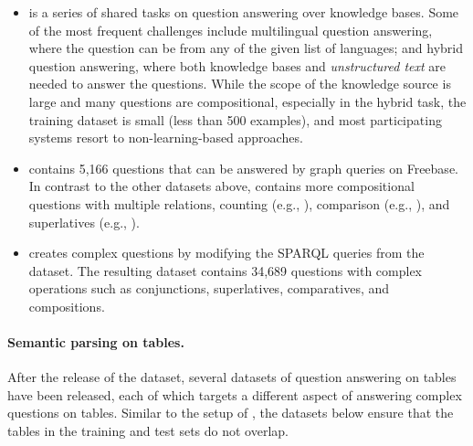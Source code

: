 \begin{itemize}

\item {} \cite{lopez2013evaluating}
is a series of shared tasks on question answering
over knowledge bases. Some of the most frequent challenges include
multilingual question answering, where the question can be from
any of the given list of languages;
and hybrid question answering, where both knowledge bases
and \emph{unstructured text} are needed to answer the questions.
While the scope of the knowledge source is large and
many questions are compositional,
especially in the hybrid task,
the training dataset is small (less than 500 examples),
and most participating systems resort to non-learning-based approaches.

\item {} \cite{su2016graphquestions}
contains 5,166 questions
that can be answered by graph queries on Freebase.
In contrast to the other datasets above,
 contains
more compositional questions
with multiple relations, counting (e.g., ),
comparison (e.g., ),
and superlatives (e.g., ).

\item {} \cite{talmor2018web}
creates complex questions by modifying the SPARQL queries
from the  dataset.
The resulting dataset contains 34,689 questions
with complex operations such as conjunctions,
superlatives, comparatives, and compositions.

\end{itemize}

\paragraph{Semantic parsing on tables.}
After the release of the \wtq dataset,
several datasets of question answering on tables
have been released,
each of which targets a different aspect
of answering complex questions on tables.
Similar to the setup of \wtq,
the datasets below ensure that the tables in the training
and test sets do not overlap.

